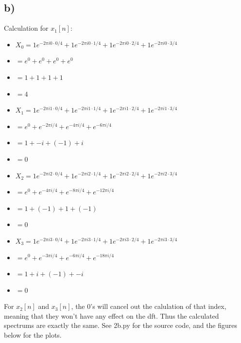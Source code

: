 \subsection*{b)}
Calculation for \(x_1[n]\):
\begin{itemize}[leftmargin=*]
  \item[] \(X_0 = 1 e^{-2 \pi i 0 \cdot 0 / 4} + 1 e^{-2 \pi i 0 \cdot 1 / 4} + 1 e^{-2 \pi i 0 \cdot 2 / 4} + 1 e^{-2 \pi i 0 \cdot 3 / 4}\)
  \item[] \(= e^0 + e^0 + e^0 + e^0\)
  \item[] \(= 1 + 1 + 1 + 1\)
  \item[] \(= 4\)
\end{itemize}
\begin{itemize}[leftmargin=*]
  \item[] \(X_1 = 1 e^{-2 \pi i 1 \cdot 0 / 4} + 1 e^{-2 \pi i 1 \cdot 1 / 4} + 1 e^{-2 \pi i 1 \cdot 2 / 4} + 1 e^{-2 \pi i 1 \cdot 3 / 4}\)
  \item[] \(= e^0 + e^{-2 \pi i / 4} + e^{-4 \pi i / 4} + e^{-6 \pi i / 4}\)
  \item[] \(= 1 + -i + (-1) + i\)
  \item[] \(= 0\)
\end{itemize}
\begin{itemize}[leftmargin=*]
  \item[] \(X_2 = 1 e^{-2 \pi i 2 \cdot 0 / 4} + 1 e^{-2 \pi i 2 \cdot 1 / 4} + 1 e^{-2 \pi i 2 \cdot 2 / 4} + 1 e^{-2 \pi i 2 \cdot 3 / 4}\)
  \item[] \(= e^0 + e^{-4 \pi i / 4} + e^{-8 \pi i / 4} + e^{-12 \pi i / 4}\)
  \item[] \(= 1 + (-1) + 1 + (-1)\)
  \item[] \(= 0\)
\end{itemize}
\begin{itemize}[leftmargin=*]
  \item[] \(X_3 = 1 e^{-2 \pi i 3 \cdot 0 / 4} + 1 e^{-2 \pi i 3 \cdot 1 / 4} + 1 e^{-2 \pi i 3 \cdot 2 / 4} + 1 e^{-2 \pi i 3 \cdot 3 / 4}\)
  \item[] \(= e^0 + e^{-3 \pi i / 4} + e^{-6 \pi i / 4} + e^{-18 \pi i / 4}\)
  \item[] \(= 1 + i + (-1) + -i\)
  \item[] \(= 0\)
\end{itemize}
For \(x_2[n]\) and \(x_3[n]\), the 0's will cancel out the calulation of that index, meaning that they won't have any effect on the dft.
Thus the calculated spectrums are exactly the same.
See 2b.py for the source code, and the figures below for the plots.

